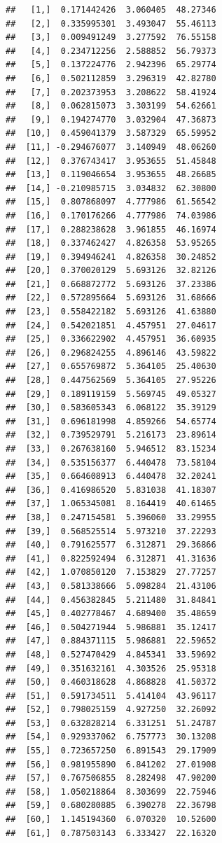 \documentclass[article]{jss}\usepackage[]{graphicx}\usepackage[]{xcolor}
\makeatletter
\newenvironment{kframe}{%
 \def\at@end@of@kframe{}%
 \ifinner\ifhmode%
  \def\at@end@of@kframe{\end{minipage}}%
  \begin{minipage}{\columnwidth}%
 \fi\fi%
 \def\FrameCommand##1{\hskip\@totalleftmargin \hskip-\fboxsep
 \colorbox{shadecolor}{##1}\hskip-\fboxsep
     \hskip-\linewidth \hskip-\@totalleftmargin \hskip\columnwidth}%
 \MakeFramed {\advance\hsize-\width
   \@totalleftmargin\z@ \linewidth\hsize
   \@setminipage}}%
 {\par\unskip\endMakeFramed%
 \at@end@of@kframe}
\newenvironment{knitrout}{}{} %
\makeatother
\begin{document}
\begin{knitrout}
\begin{kframe}
\begin{verbatim}
##   [1,]  0.171442426  3.060405  48.27346
##   [2,]  0.335995301  3.493047  55.46113
##   [3,]  0.009491249  3.277592  76.55158
##   [4,]  0.234712256  2.588852  56.79373
##   [5,]  0.137224776  2.942396  65.29774
##   [6,]  0.502112859  3.296319  42.82780
##   [7,]  0.202373953  3.208622  58.41924
##   [8,]  0.062815073  3.303199  54.62661
##   [9,]  0.194274770  3.032904  47.36873
##  [10,]  0.459041379  3.587329  65.59952
##  [11,] -0.294676077  3.140949  48.06260
##  [12,]  0.376743417  3.953655  51.45848
##  [13,]  0.119046654  3.953655  48.26685
##  [14,] -0.210985715  3.034832  62.30800
##  [15,]  0.807868097  4.777986  61.56542
##  [16,]  0.170176266  4.777986  74.03986
##  [17,]  0.288238628  3.961855  46.16974
##  [18,]  0.337462427  4.826358  53.95265
##  [19,]  0.394946241  4.826358  30.24852
##  [20,]  0.370020129  5.693126  32.82126
##  [21,]  0.668872772  5.693126  37.23386
##  [22,]  0.572895664  5.693126  31.68666
##  [23,]  0.558422182  5.693126  41.63880
##  [24,]  0.542021851  4.457951  27.04617
##  [25,]  0.336622902  4.457951  36.60935
##  [26,]  0.296824255  4.896146  43.59822
##  [27,]  0.655769872  5.364105  25.40630
##  [28,]  0.447562569  5.364105  27.95226
##  [29,]  0.189119159  5.569745  49.05327
##  [30,]  0.583605343  6.068122  35.39129
##  [31,]  0.696181998  4.859266  54.65774
##  [32,]  0.739529791  5.216173  23.89614
##  [33,]  0.267638160  5.946512  83.15234
##  [34,]  0.535156377  6.440478  73.58104
##  [35,]  0.664608913  6.440478  32.20241
##  [36,]  0.416986520  5.831038  41.18307
##  [37,]  1.065345081  8.164419  40.61465
##  [38,]  0.247154581  5.396060  33.29955
##  [39,]  0.568525514  5.973210  37.22293
##  [40,]  0.791625577  6.312871  29.36866
##  [41,]  0.822592494  6.312871  41.31636
##  [42,]  1.070850120  7.153829  27.77257
##  [43,]  0.581338666  5.098284  21.43106
##  [44,]  0.456382845  5.211480  31.84841
##  [45,]  0.402778467  4.689400  35.48659
##  [46,]  0.504271944  5.986881  35.12417
##  [47,]  0.884371115  5.986881  22.59652
##  [48,]  0.527470429  4.845341  33.59692
##  [49,]  0.351632161  4.303526  25.95318
##  [50,]  0.460318628  4.868828  41.50372
##  [51,]  0.591734511  5.414104  43.96117
##  [52,]  0.798025159  4.927250  32.26092
##  [53,]  0.632828214  6.331251  51.24787
##  [54,]  0.929337062  6.757773  30.13208
##  [55,]  0.723657250  6.891543  29.17909
##  [56,]  0.981955890  6.841202  27.01908
##  [57,]  0.767506855  8.282498  47.90200
##  [58,]  1.050218864  8.303699  22.75946
##  [59,]  0.680280885  6.390278  22.36798
##  [60,]  1.145194360  6.070320  10.52600
##  [61,]  0.787503143  6.333427  22.16320

\end{verbatim}
\end{kframe}
\end{knitrout}
\end{document}
